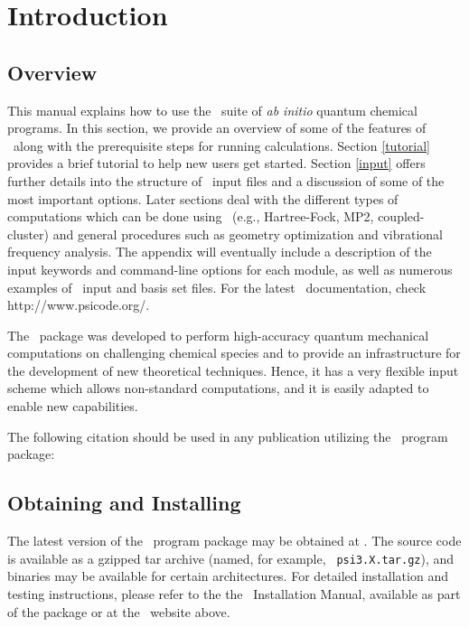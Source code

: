 \section{Introduction} \label{introduction}

\subsection{Overview} 

This manual explains how to use the \PSIthree\ suite of {\em ab initio}
quantum chemical programs.  In this section, we provide an overview of
some of the features of \PSIthree\ along with the prerequisite steps for
running calculations.  Section \ref{tutorial} provides a brief tutorial to
help new users get started.  Section \ref{input} offers further details
into the structure of \PSIthree\ input files and a discussion of some of
the most important options.  Later sections deal with the different types
of computations which can be done using \PSIthree\ (e.g., Hartree-Fock,
MP2, coupled-cluster) and general procedures such as geometry optimization
and vibrational frequency analysis.  The appendix will eventually include a
description of the input keywords and command-line options for each module,
as well as numerous examples of \PSIthree\ input and basis set files.
For the latest \PSIthree\ documentation, check  {http://www.psicode.org/}.

The \PSIthree\ package was developed to perform high-accuracy quantum
mechanical computations on challenging chemical species and to provide an
infrastructure for the development of new theoretical techniques.  Hence,
it has a very flexible input scheme which allows non-standard computations,
and it is easily adapted to enable new capabilities.

The following citation should be used in any publication utilizing the
\PSIthree\ program package:

\begin{quotation}
\noindent

\end{quotation}

\subsection{Obtaining and Installing \PSIthree}
\label{installation}

The latest version of the \PSIthree\ program package may be obtained at
.  The
source code is available as a gzipped tar archive (named, for example, {\tt
psi3.X.tar.gz}), and binaries may be available for certain architectures.
For detailed installation and testing instructions, please refer to the
the \PSIthree\ Installation Manual, available as part of the package or
at the \PSIthree\ website above.

